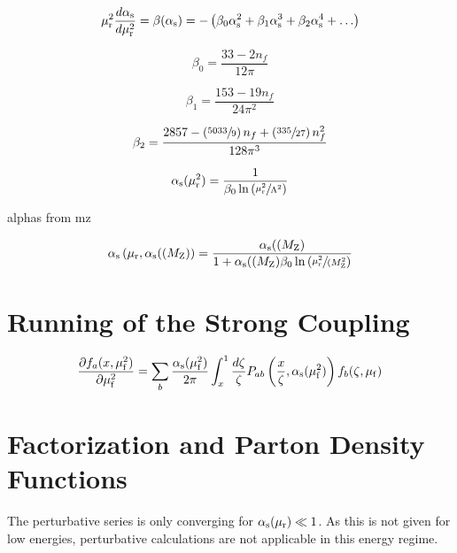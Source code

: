 \begin{equation}
    \mu_{\mathrm{r}}^2 \frac{d \alpha_\mathrm{s}}{d \mu_{\mathrm{r}}^2} = \beta(\alpha_\mathrm{s}) = - \left( \beta_0 \alpha_\mathrm{s}^2 + \beta_1 \alpha_\mathrm{s}^3
    + \beta_2 \alpha_\mathrm{s}^4 + \ldots \right)
\end{equation}

\begin{equation} 
    \beta_0 = \frac{33 - 2 n_f}{12\pi}
\end{equation}

\begin{equation} 
    \beta_1 = \frac{153 - 19 n_f}{24\pi^2}
\end{equation}

\begin{equation} 
   \beta_2 = \frac{2857 -\left(\sfrac{5033}{9}\right)n_f + \left(\sfrac{335}{27}
   \right)n_f^2}{128 \pi^3}
\end{equation}

\begin{equation*}
   \alpha_\mathrm{s}(\mu_{\mathrm{r}}^2) = \frac{1}{\beta_0 \ln \left( \sfrac{\mu_{\mathrm{r}}^2}{\Lambda^2} \right)}
\end{equation*}


alphas from mz

\begin{equation*}
   \alpha_\mathrm{s}\left(\mu_{\mathrm{r}}, \alpha_\mathrm{s}((M_\mathrm{Z})\right) = \frac{\alpha_\mathrm{s}((M_\mathrm{Z})}{1 + \alpha_\mathrm{s}((M_\mathrm{Z})\beta_0 \ln
       \left( \sfrac{\mu_{\mathrm{r}}^2}{(M_\mathrm{Z}^2} \right)}
\end{equation*}



\section{Running of the Strong Coupling}

\begin{equation*}
    \frac{\partial f_a (x, \mu_{\mathrm{f}}^2)}{\partial \mu_{\mathrm{f}}^2} = \sum_b \frac{\alpha_\mathrm{s}(\mu_{\mathrm{f}}^2)}{2 \pi} \int_x^1
    \frac{d \zeta}{\zeta} P_{ab} \left(\frac{x}{\zeta},
    \alpha_\mathrm{s}(\mu_{\mathrm{f}}^2)\right) f_b(\zeta, \mu_{\mathrm{f}})
\end{equation*}



\section{Factorization and Parton Density Functions}

The perturbative series is only converging for $\alpha_\mathrm{s}(\mu_{\mathrm{r}}) \ll 1$. As this is not
given for low energies, perturbative calculations are not applicable in this
energy regime. 

